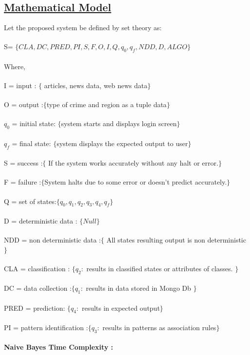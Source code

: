 \subsection*{\underline{Mathematical Model}}
 Let the proposed system be defined by set theory as:\\\\
S= $\{CLA , DC , PRED , PI , S , F , O , I , Q , q_0 , q_f , NDD , D , ALGO \}$ \\ \\
Where, \\ \\
I = input : $\{$ articles, news data, web news data$\}$ \\ \\
O = output :$\{ $type of crime and region as a tuple data$\}$ \\\\
$q_0$ = initial state: $\{$system starts and displays login screen$\}$ \\\\
$q_f$ = final state: $\{$system displays the expected output to user$\}$ \\\\
S = success :$\{$ If the system works accurately without any halt or error.$\}$ \\\\
F = failure :$\{$System halts due to some error or doesn't predict accurately.$\}$\\\\
Q = set of states:$ \{q_0, q_1, q_2, q_3, q_4, q_f\} $\\\\
D = deterministic data : $\{ Null\}$ \\\\
NDD = non deterministic data :$\{$ All states resulting output is non deterministic$\}$\\\\
CLA = classification : $\{ q_2:$ results in classified states or attributes of classes. $\}$\\\\
DC = data collection :$\{ q_1:$ results in data stored in Mongo Db $\}$\\\\
PRED = prediction: $\{q_4:$ results in expected output$\}$\\\\
PI = pattern identification :$\{ q_3:$ results in patterns as association rules$\}$ \\\\
\noindent
\textbf{Naive Bayes Time Complexity : }\\


